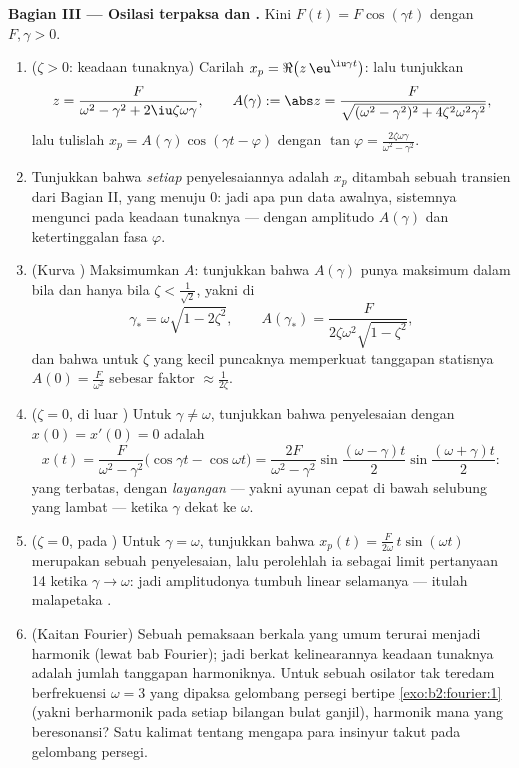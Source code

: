 \begin{problem}
\medskip
\noindent\textbf{Bagian III --- Osilasi terpaksa dan
.} Kini $F(t) = F\cos(\gamma t)$ dengan $F, \gamma > 0$.
\begin{enumerate}[resume]
  \item ($\zeta > 0$: keadaan tunaknya) Carilah $x_p =
        \Re\bigl(z\,\eu^{\iu\gamma t}\bigr)$: lalu tunjukkan
        \[
        z = \frac{F}{\omega^2 - \gamma^2 +
        2\iu\zeta\omega\gamma},
        \qquad
        A(\gamma) := \abs z = \frac{F}{\sqrt{(\omega^2 -
        \gamma^2)^2 + 4\zeta^2\omega^2\gamma^2}} ,
        \]
        lalu tulislah $x_p = A(\gamma)\cos(\gamma t - \varphi)$
        dengan $\tan\varphi =
        \frac{2\zeta\omega\gamma}{\omega^2-\gamma^2}$.
  \item Tunjukkan bahwa \emph{setiap} penyelesaiannya adalah $x_p$ ditambah
        sebuah transien dari Bagian II, yang menuju $0$: jadi apa pun
        data awalnya, sistemnya mengunci pada keadaan
        tunaknya --- dengan amplitudo $A(\gamma)$ dan ketertinggalan fasa
        $\varphi$.
  \item (Kurva ) Maksimumkan $A$: tunjukkan bahwa
        $A(\gamma)$ punya maksimum dalam bila dan hanya bila $\zeta <
        \frac{1}{\sqrt2}$, yakni di
        \[
        \gamma_* = \omega\sqrt{1 - 2\zeta^2},
        \qquad
        A(\gamma_*) =
        \frac{F}{2\zeta\omega^2\sqrt{1-\zeta^2}} ,
        \]
        dan bahwa untuk $\zeta$ yang kecil puncaknya memperkuat
        tanggapan statisnya $A(0) = \frac F{\omega^2}$ sebesar
        faktor $\approx \frac{1}{2\zeta}$.
  \item ($\zeta = 0$, di luar ) Untuk $\gamma \neq \omega$,
        tunjukkan bahwa penyelesaian dengan $x(0) = x'(0) = 0$ adalah
        \[
        x(t) = \frac{F}{\omega^2 -
        \gamma^2}\bigl(\cos\gamma t - \cos\omega t\bigr)
        = \frac{2F}{\omega^2-\gamma^2}
        \sin\frac{(\omega-\gamma)t}{2}
        \sin\frac{(\omega+\gamma)t}{2} :
        \]
        yang terbatas, dengan \emph{layangan} --- yakni ayunan cepat
        di bawah selubung yang lambat --- ketika $\gamma$ dekat ke
        $\omega$.
  \item ($\zeta = 0$, pada ) Untuk $\gamma = \omega$, tunjukkan
        bahwa $x_p(t) = \frac{F}{2\omega}\,t\sin(\omega t)$ merupakan
        sebuah penyelesaian, lalu perolehlah ia sebagai limit pertanyaan
        14 ketika $\gamma \to \omega$: jadi amplitudonya tumbuh
        linear selamanya --- itulah malapetaka .
  \item (Kaitan Fourier) Sebuah pemaksaan berkala yang umum terurai
        menjadi harmonik (lewat bab Fourier); jadi berkat kelinearannya
        keadaan tunaknya adalah jumlah tanggapan harmoniknya. Untuk
        sebuah osilator tak teredam berfrekuensi $\omega = 3$ yang
        dipaksa gelombang persegi bertipe
        \cref{exo:b2:fourier:1} (yakni berharmonik pada setiap
        bilangan bulat ganjil), harmonik mana yang beresonansi? Satu kalimat tentang
        mengapa para insinyur takut pada gelombang persegi.
\end{enumerate}


\end{problem}
